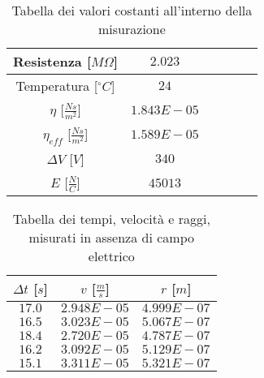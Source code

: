 \documentclass{article}
\begin{document}
\begin{multicols}{2}

\begin{table}[H]
	\centering
	\begin{tabular}{| c | c | c | c | c | c |}
		\hline
		Resistenza [$M\Omega$] & $2.023$\\
		\hline
		Temperatura [$^\circ C$]& $24$\\
		\hline
		$\eta$ [$\frac{Ns}{m^2}$] & $1.843E-05$\\
		\hline
		$\eta_{eff}$ [$\frac{Ns}{m^2}$] & $1.589E-05$\\
		\hline
		$\Delta V$ [$V$] & $340$\\
		\hline
		$E$ [$\frac N C$] & $45013$\\
		\hline
	\end{tabular}
	\caption{Tabella dei valori costanti all'interno della misurazione}
	\label{}
\end{table}

\columnbreak

\begin{table}[H]
	\centering
	\begin{tabular}{| c | c | c |}
		\hline
		$\Delta t$ [$s$] & $v$ [$\frac ms$] & $r$ [$m$] \\
		\hline
		$17.0$ & $2.948E-05$ & $4.999E-07$ \\
		$16.5$ & $3.023E-05$ & $5.067E-07$ \\
		$18.4$ & $2.720E-05$ & $4.787E-07$ \\
		$16.2$ & $3.092E-05$ & $5.129E-07$ \\
		$15.1$ & $3.311E-05$ & $5.321E-07$ \\
		\hline
	\end{tabular}
	\caption{Tabella dei tempi, velocità e raggi, misurati in assenza di campo elettrico}
	\label{}
\end{table}
	
\end{multicols}
\end{document}
